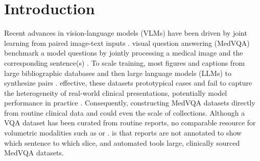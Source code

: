 \documentclass[bioengineering,article,submit,pdftex,moreauthors]{Definitions/mdpi}
\begin{document}
\section{Introduction}

Recent advances in vision-language models (VLMs) have been driven by joint learning from paired image-text inputs \cite{li_llava-next-interleave_2024,xiao_florence-2_2024,chen_internvl_2024,alayrac_flamingo_2022}. 
 visual question answering (MedVQA)    benchmark   a model  questions by jointly processing a medical image and the corresponding sentence(s) \cite{lau_dataset_2018,liu_slake_2021}. 
To scale training, most   figures and captions from large bibliographic databases and then  large language models (LLMs) to synthesize  pairs \cite{zhang_pmc-vqa_2024,li_llava-med_2023}. 
 effective, these  datasets  prototypical cases and  fail to capture the heterogeneity of real-world clinical presentations, potentially  model performance in practice \cite{zhang_pmc-vqa_2024,dong_generative_2025}. 
Consequently, constructing MedVQA datasets directly from routine clinical data      and could even  the scale of  collections. 
Although a VQA dataset has been curated from routine  reports, no comparable resource   for volumetric modalities such as  or  \cite{bae_ehrxqa_2024}. 
   is that reports are not annotated to show which sentence  to which slice, and automated tools          large, clinically sourced MedVQA datasets. 
\end{document}
